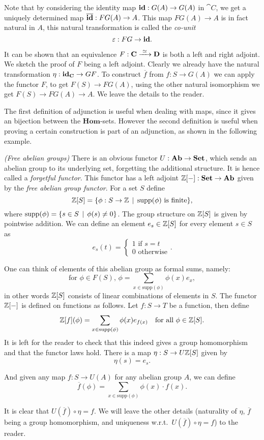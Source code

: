 Note that by considering the identity map $\mathbf{id} : G(A) \to G(A)$ in $\cat{C}$, we get a uniquely determined map $\overline{\mathbf{id}}:FG(A) \to A$. This map $FG(A) \to A$ is in fact natural in $A$, this natural transformation is called the \emph{co-unit}
$$ \varepsilon: FG \to \mathbf{id}. $$

It can be shown that an equivalence $F: \mathbf{C} \xrightarrow{\,\,{\simeq}\,\,} \mathbf{D}$ is both a left and right adjoint. We sketch the proof of $F$ being a left adjoint. Clearly we already have the natural transformation $\eta: \mathbf{id}_{\mathbf{C}} \to GF$. To construct $\overline{f}$ from $f: S \to G(A)$ we can apply the functor $F$, to get $F(S) \to FG(A)$, using the other natural isomorphism we get $F(S) \to FG(A) \to A$. We leave the details to the reader.

The first definition of adjunction is useful when dealing with maps, since it gives an bijection between the $\mathbf{Hom}$-sets. However the second definition is useful when proving a certain construction is part of an adjunction, as shown in the following example.

\begin{example}
	\emph{(Free abelian groups)} There is an obvious functor $U: \mathbf{Ab} \to \mathbf{Set}$, which sends an abelian group to its underlying set, forgetting the additional structure. It is hence called a \emph{forgetful functor}. This functor has a left adjoint $\mathbb{Z}[-]: \mathbf{Set} \to \mathbf{Ab}$  given by the \emph{free abelian group functor}. For a set $S$ define
	$$ \mathbb{Z}[S] = \{ \phi: S \to \mathbb{Z} \,\mid\, \text{supp}(\phi) \text{ is finite}\}, $$
	where $\text{supp}(\phi) = \{ s \in S \,\mid\, \phi(s) \neq 0 \}$. The group structure on $\mathbb{Z}[S]$ is given by pointwise addition. We can define an element $e_s \in \mathbb{Z}[S]$ for every element $s \in S$ as
	$$ e_s(t) =
	\begin{cases}
		1 \text{ if } s = t \\
		0 \text{ otherwise}
	\end{cases}. $$

	One can think of elements of this abelian group as formal sums, namely:
	$$ \text{for } \phi \in F(S),\, \phi = \sum_{x \in \text{supp}(\phi)}\phi(x) e_x, $$
	in other words $\mathbb{Z}[S]$ consists of linear combinations of elements in $S$. The functor $\mathbb{Z}[-]$ is defined on functions as follows. Let $f: S \to T$ be a function, then define
	$$ \mathbb{Z}[f](\phi) = \sum_{x \in \text{supp}(\phi)} \phi(x) e_{f(x)} \quad\text{for all } \phi \in \mathbb{Z}[S]. $$
	It is left for the reader to check that this indeed gives a group homomorphism and that the functor laws hold. There is a map $\eta: S \to U\mathbb{Z}[S]$ given by
	$$ \eta(s) = e_s. $$

	And given any map $f: S \to U(A)$ for any abelian group $A$, we can define
	$$ \overline{f}(\phi) = \sum_{x \in \text{supp}(\phi)} \phi(x) \cdot f(x). $$

	It is clear that $U(\overline{f}) \circ \eta = f$. We will leave the other details (naturality of $\eta$, $\overline{f}$ being a group homomorphism, and uniqueness w.r.t.~$U(\overline{f}) \circ \eta = f$) to the reader.
\end{example}


